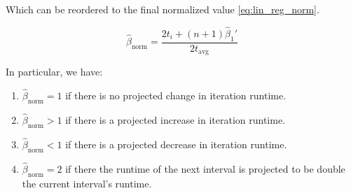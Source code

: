 Which can be reordered to the final normalized value \eqref{eq:lin_reg_norm}.


\begin{equation}
	\hat\beta_{\text{norm}} = \frac{2t_i+(n+1)\hat\beta_1'}{2t_{\text{avg}}}\label{eq:lin_reg_norm}
\end{equation}

In particular, we have:
\begin{enumerate}[label=(\roman*)]
	\item $\hat\beta_{\text{norm}} = 1$ if there is no projected change in iteration runtime.
	\item $\hat\beta_{\text{norm}} > 1$ if there is a projected increase in iteration runtime.
	\item $\hat\beta_{\text{norm}} < 1$ if there is a projected decrease in iteration runtime.
	\item $\hat\beta_{\text{norm}} = 2$ if there the runtime of the next interval is projected to be double the current interval's runtime.
\end{enumerate}

